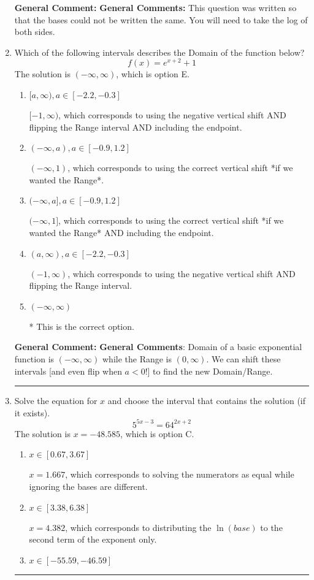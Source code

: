 \documentclass{extbook}[14pt]
\newcommand{\litem}[1]{\item #1

\rule{\textwidth}{0.4pt}}
\begin{document}
\begin{enumerate}
{\textbf{General Comment:} \textbf{General Comments:} This question was written so that the bases could not be written the same. You will need to take the log of both sides.
}
\litem{
Which of the following intervals describes the Domain of the function below?
\[ f(x) = e^{x+2}+1 \]The solution is \( (-\infty, \infty) \), which is option E.\begin{enumerate}[label=\Alph*.]
\item \( [a, \infty), a \in [-2.2, -0.3] \)

$[-1, \infty)$, which corresponds to using the negative vertical shift AND flipping the Range interval AND including the endpoint.
\item \( (-\infty, a), a \in [-0.9, 1.2] \)

$(-\infty, 1)$, which corresponds to using the correct vertical shift *if we wanted the Range*.
\item \( (-\infty, a], a \in [-0.9, 1.2] \)

$(-\infty, 1]$, which corresponds to using the correct vertical shift *if we wanted the Range* AND including the endpoint.
\item \( (a, \infty), a \in [-2.2, -0.3] \)

$(-1, \infty)$, which corresponds to using the negative vertical shift AND flipping the Range interval.
\item \( (-\infty, \infty) \)

* This is the correct option.
\end{enumerate}

\textbf{General Comment:} \textbf{General Comments}: Domain of a basic exponential function is $(-\infty, \infty)$ while the Range is $(0, \infty)$. We can shift these intervals [and even flip when $a<0$!] to find the new Domain/Range.
}
\litem{
Solve the equation for $x$ and choose the interval that contains the solution (if it exists).
\[ 5^{5x-3} = 64^{2x+2} \]The solution is \( x = -48.585 \), which is option C.\begin{enumerate}[label=\Alph*.]
\item \( x \in [0.67, 3.67] \)

$x = 1.667$, which corresponds to solving the numerators as equal while ignoring the bases are different.
\item \( x \in [3.38, 6.38] \)

$x = 4.382$, which corresponds to distributing the $\ln(base)$ to the second term of the exponent only.
\item \( x \in [-55.59, -46.59] \)


\end{enumerate}}
\end{enumerate}
\end{document}
